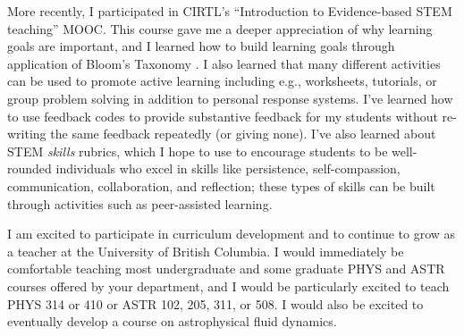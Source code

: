 \documentclass[11pt]{article}
\begin{document}
More recently, I participated in CIRTL's ``Introduction to Evidence-based STEM teaching'' MOOC.
This course gave me a deeper appreciation of why learning goals are important, and I learned how to build learning goals through application of Bloom's Taxonomy \citep{simon_taylor_2008}.
I also learned that many different activities can be used to promote active learning including e.g., worksheets, tutorials, or group problem solving in addition to personal response systems.
I've learned how to use feedback codes to provide substantive feedback for my students without re-writing the same feedback repeatedly (or giving none).
I've also learned about STEM \emph{skills} rubrics, which I hope to use to encourage students to be well-rounded individuals who excel in skills like persistence, self-compassion, communication, collaboration, and reflection; these types of skills can be built through activities such as peer-assisted learning.


I am excited to participate in curriculum development and to continue to grow as a teacher at the University of British Columbia.
I would immediately be comfortable teaching most undergraduate and some graduate PHYS and ASTR courses offered by your department, and I would be particularly excited to teach PHYS 314 or 410 or ASTR 102, 205, 311, or 508.
I would also be excited to eventually develop a course on astrophysical fluid dynamics.


{\scriptsize

}
\end{document}
